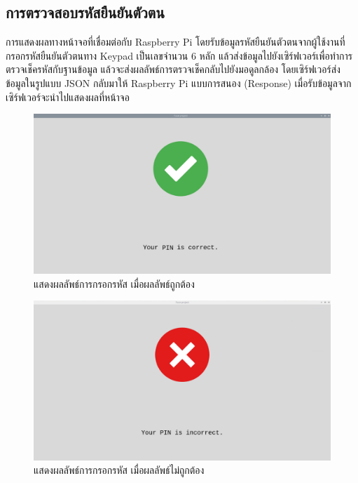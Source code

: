 \subsection{การตรวจสอบรหัสยืนยันตัวตน}
การแสดงผลทางหน้าจอที่เชื่อมต่อกับ Raspberry Pi โดยรับข้อมูลรหัสยืนยันตัวตนจากผู้ใช้งานที่กรอกรหัสยืนยันตัวตนทาง Keypad เป็นเลขจำนวน 6 หลัก
แล้วส่งข้อมูลไปยังเซิร์ฟเวอร์เพื่อทำการตรวจเช็ครหัสกับฐานข้อมูล แล้วจะส่งผลลัพธ์การตรวจเช็คกลับไปยังมอดูลกล้อง
โดยเซิร์ฟเวอร์ส่งข้อมูลในรูปแบบ JSON กลับมาให้ Raspberry Pi แบบการสนอง (Response) เมื่อรับข้อมูลจากเซิร์ฟเวอร์จะนำไปแสดงผลที่หน้าจอ 
\newpage
\begin{figure}[ht]
  \begin{center}
    \includegraphics[scale=.3]{pic/pin_correct.png}
  \caption[แสดงผลลัพธ์การกรอกรหัส เมื่อผลลัพธ์ถูกต้อง]{แสดงผลลัพธ์การกรอกรหัส เมื่อผลลัพธ์ถูกต้อง}
  \end{center}
  \label{fig:confirmT}
\end{figure}

\begin{figure}[ht]
  \begin{center}
    \includegraphics[scale=.3]{pic/pin_incorrect.png}
  \caption[แสดงผลลัพธ์การกรอกรหัส เมื่อผลลัพธ์ไม่ถูกต้อง]{แสดงผลลัพธ์การกรอกรหัส เมื่อผลลัพธ์ไม่ถูกต้อง}
  \end{center}
  \label{fig:confirmF}
\end{figure}

